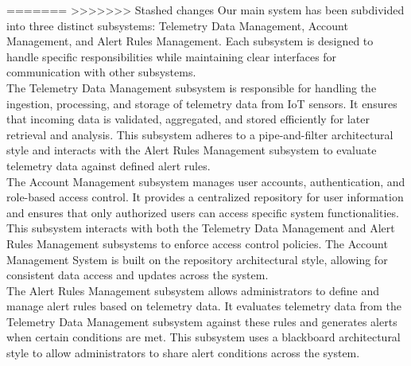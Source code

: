 {=======
>>>>>>> Stashed changes
\noindent Our main system has been subdivided into three distinct subsystems: Telemetry Data Management, Account Management, and Alert Rules Management. Each subsystem is designed to handle specific responsibilities while maintaining clear interfaces for communication with other subsystems. \\

\noindent The Telemetry Data Management subsystem is responsible for handling the ingestion, processing, and storage of telemetry data from IoT sensors. It ensures that incoming data is validated, aggregated, and stored efficiently for later retrieval and analysis. This subsystem adheres to a pipe-and-filter architectural style and interacts with the Alert Rules Management subsystem to evaluate telemetry data against defined alert rules. \\

\noindent The Account Management subsystem manages user accounts, authentication, and role-based access control. It provides a centralized repository for user information and ensures that only authorized users can access specific system functionalities. This subsystem interacts with both the Telemetry Data Management and Alert Rules Management subsystems to enforce access control policies. The Account Management System is built on the repository architectural style, allowing for consistent data access and updates across the system. \\

\noindent The Alert Rules Management subsystem allows administrators to define and manage alert rules based on telemetry data. It evaluates telemetry data from the Telemetry Data Management subsystem against these rules and generates alerts when certain conditions are met. This subsystem uses a blackboard architectural style to allow administrators to share alert conditions across the system. \\
}